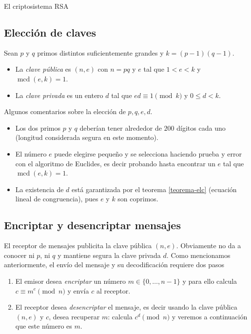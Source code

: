 \begin{section}{El criptosistema RSA}

\subsection*{Elección de claves}



Sean  $p$ y $q$ primos distintos suficientemente grandes y $k =(p-1)(q-1)$. 
\begin{itemize}
    \item  La \emph{clave pública} es $(n, e)$ con $n = pq$ y $e$ tal que $1 < e < k$ y $\operatorname{mcd}(e, k) = 1$. 
    \item  La \emph{clave privada} es un entero $d$ tal que $ed \equiv 1 \pmod{k}$ y $0 \le d <k$.
\end{itemize}


\begin{observacion*} Algunos comentarios sobre la elección de $p,q,e,d$.
\begin{itemize}
\item
Los dos primos $p$ y $q$ deberían tener alrededor de $200$ dígitos cada uno (longitud considerada segura en este momento).
\item
El número $e$ puede elegirse pequeño y se selecciona haciendo prueba y error con el algoritmo de Euclides, es decir probando hasta encontrar un $e$ tal que $\operatorname{mcd}(e, k) = 1$.
\item
La existencia de $d$ está garantizada por el teorema \ref{teorema-elc} (ecuación lineal de congruencia), pues $e$ y $k$ son coprimos.
\end{itemize}

\end{observacion*}



\subsection*{Encriptar y desencriptar mensajes}

El receptor de mensajes publicita la clave pública $(n,e)$. Obviamente no da a conocer ni $p$, ni $q$ y mantiene segura la clave privada $d$. Como mencionamos anteriormente, el envío del mensaje y su decodificación requiere dos pasos
\begin{enumerate}[label=\textit{\alph*)}]
\item  El  emisor desea \emph{encriptar }un número $m \in \{0,\ldots,n-1\}$ y para ello calcula $c \equiv m^e \pmod{n}$ y  envía $c$ al receptor.
\item  El receptor desea \emph{desencriptar} el mensaje, es decir usando la clave pública $(n, e)$ y $c$, desea recuperar $m$: calcula $c^d \pmod{n}$ y veremos a continuación que este número es $m$. 
\end{enumerate}


\end{section}
